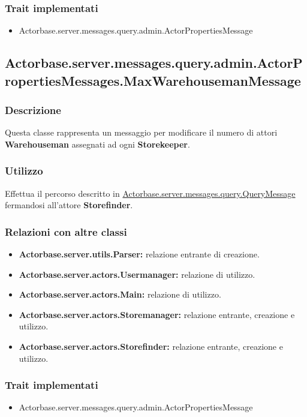 \documentclass[a4paper]{article}
\begin{document}
			\subsubsection{Trait implementati}
				\begin{itemize}
					\item Actorbase.server.messages.query.admin.ActorPropertiesMessage
				\end{itemize}

		\subsection{Actorbase.server.messages.query.admin.ActorPropertiesMessages.MaxWarehousemanMessage}
			\subsubsection{Descrizione}
				Questa classe rappresenta un messaggio per modificare il numero di attori \textbf{Warehouseman} assegnati ad ogni \textbf{Storekeeper}.
				
			\subsubsection{Utilizzo}
				Effettua il percorso descritto in \hyperref[QueryMessage]{Actorbase.server.messages.query.QueryMessage} fermandosi all'attore 
				\textbf{Storefinder}.
				
			\subsubsection{Relazioni con altre classi}
				\begin{itemize}
					\item \textbf{Actorbase.server.utils.Parser:} relazione entrante di creazione.
					\item \textbf{Actorbase.server.actors.Usermanager:} relazione di utilizzo.
					\item \textbf{Actorbase.server.actors.Main:} relazione di utilizzo.
					\item \textbf{Actorbase.server.actors.Storemanager:} relazione entrante, creazione e utilizzo.
					\item \textbf{Actorbase.server.actors.Storefinder:} relazione entrante, creazione e utilizzo.
				\end{itemize}
			\subsubsection{Trait implementati}
				\begin{itemize}
					\item Actorbase.server.messages.query.admin.ActorPropertiesMessage
				\end{itemize}
		
\end{document}
